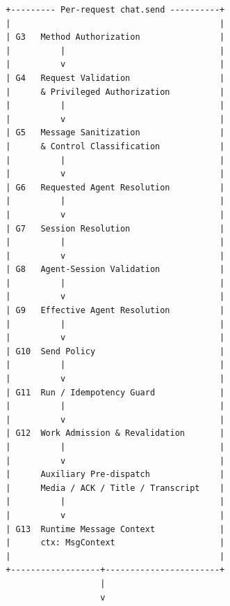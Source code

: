 \begin{landscape}
\begin{figure}[p]
\begin{verbatim}
        +--------- Per-request chat.send ----------+
        |                                          |
        | G3   Method Authorization                |
        |          |                               |
        |          v                               |
        | G4   Request Validation                  |
        |      & Privileged Authorization          |
        |          |                               |
        |          v                               |
        | G5   Message Sanitization                |
        |      & Control Classification            |
        |          |                               |
        |          v                               |
        | G6   Requested Agent Resolution          |
        |          |                               |
        |          v                               |
        | G7   Session Resolution                  |
        |          |                               |
        |          v                               |
        | G8   Agent-Session Validation            |
        |          |                               |
        |          v                               |
        | G9   Effective Agent Resolution          |
        |          |                               |
        |          v                               |
        | G10  Send Policy                         |
        |          |                               |
        |          v                               |
        | G11  Run / Idempotency Guard             |
        |          |                               |
        |          v                               |
        | G12  Work Admission & Revalidation       |
        |          |                               |
        |          v                               |
        |      Auxiliary Pre-dispatch              |
        |      Media / ACK / Title / Transcript    |
        |          |                               |
        |          v                               |
        | G13  Runtime Message Context             |
        |      ctx: MsgContext                     |
        |                                          |
        +------------------+-----------------------+
                           |
                           v


\end{verbatim}
\end{figure}
\end{landscape}
